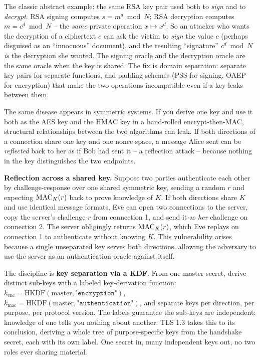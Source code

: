 \begin{whybox}
The classic abstract example: the same RSA key pair used both to \emph{sign} and to \emph{decrypt}. RSA signing computes $s = m^d \bmod N$; RSA decryption computes $m = c^d \bmod N$ -- the \emph{same} private operation $x \mapsto x^d$. So an attacker who wants the decryption of a ciphertext $c$ can ask the victim to \emph{sign} the value $c$ (perhaps disguised as an ``innocuous'' document), and the resulting ``signature'' $c^d \bmod N$ \emph{is} the decryption she wanted. The signing oracle and the decryption oracle are the same oracle when the key is shared. The fix is domain separation: separate key pairs for separate functions, and padding schemes (PSS for signing, OAEP for encryption) that make the two operations incompatible even if a key leaks between them.
\end{whybox}

The same disease appears in symmetric systems. If you derive one key and use it both as the AES key and the HMAC key in a hand-rolled encrypt-then-MAC, structural relationships between the two algorithms can leak. If both directions of a connection share one key and one nonce space, a message Alice sent can be \emph{reflected} back to her as if Bob had sent it -- a reflection attack -- because nothing in the key distinguishes the two endpoints.

\begin{attackbox}
\textbf{Reflection across a shared key.} Suppose two parties authenticate each other by challenge-response over one shared symmetric key, sending a random $r$ and expecting $\operatorname{MAC}_K(r)$ back to prove knowledge of $K$. If both directions share $K$ and use identical message formats, Eve can open two connections to the server, copy the server's challenge $r$ from connection 1, and send it as \emph{her} challenge on connection 2. The server obligingly returns $\operatorname{MAC}_K(r)$, which Eve replays on connection 1 to authenticate without knowing $K$. This vulnerability arises because a single unseparated key serves both directions, allowing the adversary to use the server as an authentication oracle against itself.
\end{attackbox}

\begin{focusbox}
The discipline is \textbf{key separation via a KDF}. From one master secret, derive distinct sub-keys with a labeled key-derivation function: $k_{\text{enc}} = \mathrm{HKDF}(\text{master}, \texttt{"encryption"})$, $k_{\text{mac}} = \mathrm{HKDF}(\text{master}, \texttt{"authentication"})$, and separate keys per direction, per purpose, per protocol version. The labels guarantee the sub-keys are independent: knowledge of one tells you nothing about another. TLS 1.3 takes this to its conclusion, deriving a whole tree of purpose-specific keys from the handshake secret, each with its own label. One secret in, many independent keys out, no two roles ever sharing material.
\end{focusbox}

